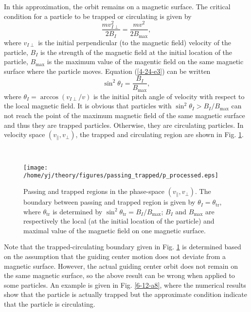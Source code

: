 \documentclass{article}
\newcommand{\tmop}[1]{\ensuremath{\operatorname{#1}}}
\begin{document}
In this approximation, the orbit remains on a magnetic surface. The critical
condition for a particle to be trapped or circulating is given by
\begin{equation}
  \label{4-24-e3} \frac{m v_{I \perp}^2}{2 B_I} = \frac{m v^2}{2 B_{\max}},
\end{equation}
where $v_{I \perp}$ is the initial perpendicular (to the magnetic field)
velocity of the particle, $B_I$ is the strength of the magnetic field at the
initial location of the particle, $B_{\max}$ is the maximum value of the
magentic field on the same magnetic surface where the particle moves. Equation
(\ref{4-24-e3}) can be written
\begin{equation}
  \label{15-9-25-2} \sin^2 \theta_I = \frac{B_I}{B_{\max}},
\end{equation}
where $\theta_I = \arccos (v_{I \perp} / v)$ is the initial pitch angle of
velocity with respect to the local magnetic field. It is obvious that
particles with $\sin^2 \theta_I > B_I / B_{\max}$ can not reach the point of
the maximum magnetic field of the same magnetic surface and thus they are
trapped particles. Otherwise, they are circulating particles. In velocity
space $(v_{\parallel}, v_{\perp})$, the trapped and circulating region are
shown in Fig. \ref{2-1-2}.

\

\begin{figure}[h]
  \texttt{[image: /home/yj/theory/figures/passing\_trapped/p\_processed.eps]}
  \caption{\label{2-1-2}Passing and trapped regions in the phase-space
  $(v_{\parallel}, v_{\perp})$. The boundary between passing and trapped
  region is given by $\theta_I = \theta_{\tmop{tr}}$, where
  $\theta_{\tmop{tr}}$ is determined by $\sin^2 \theta_{\tmop{tr}} = B_I /
  B_{\max}$; $B_I$ and $B_{\max}$ are respectively the local (at the initial
  location of the particle) and maximal value of the magnetic field on one
  magnetic surface.}
\end{figure}

Note that the trapped-circulating boundary given in Fig. \ref{2-1-2} is
determined based on the assumption that the guiding center motion does not
deviate from a magnetic surface. However, the actual guiding center orbit does
not remain on the same magnetic surface, so the above result can be wrong when
applied to some particles. An example is given in Fig. \ref{6-12-a8}, where
the numerical results show that the particle is actually trapped but the
approximate condition indicate that the particle is circulating.
\end{document}
